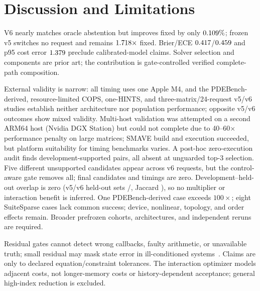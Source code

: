 \section{Discussion and Limitations}
\label{sec:discussion}

V6 nearly matches oracle abstention but improves fixed by only
$0.109\%$; frozen v5 switches no request and remains
$1.718\times$ fixed. Brier/ECE
$0.417$/$0.459$ and p95 cost error
$1.379$ preclude calibrated-model claims. Solver selection
and components are prior art; the contribution is gate-controlled verified
complete-path composition.

External validity is narrow: all timing uses one Apple M4, and the PDEBench-derived,
resource-limited COPS, one-HINTS, and three-matrix/24-request v5/v6 studies establish
neither architecture nor population performance; opposite v5/v6 outcomes show mixed
validity. Multi-host validation was attempted on a second ARM64 host (Nvidia DGX Station)
but could not complete due to 40--60$\times$ performance penalty on large matrices; SMAVE
build and execution succeeded, but platform suitability for timing benchmarks varies.
A post-hoc zero-execution audit finds \FrozenAttritionSupportedPairs{}
development-supported pairs, all absent at unguarded top-3 selection. Five different
unsupported candidates appear across \FrozenAttritionUnguardedCandidateRequests{} v6
requests, but the control-aware gate removes all; final candidates and timings are zero.
Development--held-out overlap is zero (v5/v6 held-out sets
\FrozenInteractionVFiveHeldoutPairs{}/\FrozenInteractionVSixHeldoutPairs{}, Jaccard
\FrozenInteractionHeldoutJaccard{}), so no multiplier or interaction benefit is inferred.
One PDEBench-derived case exceeds
$100\times$; eight SuiteSparse cases lack common success; device, nonlinear, topology,
and order effects remain. Broader prefrozen cohorts, architectures, and independent
reruns are required.

Residual gates cannot detect wrong callbacks, faulty arithmetic, or unavailable truth;
small residual may mask state error in ill-conditioned systems~\cite{jiang2026ens}.
Claims are only to declared equation/constraint tolerances. The interaction optimizer
models adjacent costs, not longer-memory costs or history-dependent acceptance; general
high-index reduction is excluded.
